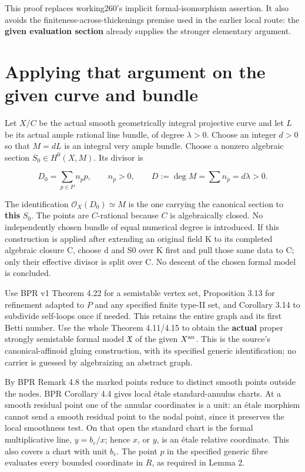\documentclass[
  11pt,
]{article}
\begin{document}
This proof replaces working260's implicit formal-isomorphism assertion.
It also avoids the finiteness-across-thickenings premise used in the
earlier local route: the \textbf{given evaluation section} already
supplies the stronger elementary argument.

\section{Applying that argument on the given curve and
bundle}\label{applying-that-argument-on-the-given-curve-and-bundle}

Let \(X/C\) be the actual smooth geometrically integral projective curve
and let \(L\) be its actual ample rational line bundle, of degree
\(\lambda>0\). Choose an integer \(d>0\) so that \(M=dL\) is an integral
very ample bundle. Choose a nonzero algebraic section
\(S_0\in H^0(X,M)\). Its divisor is

\[
 D_0=\sum_{p\in P}n_pp,\qquad n_p>0,
 \qquad D:=\deg M=\sum n_p=d\lambda>0.
\]

The identification \(\mathcal O_X(D_0)\simeq M\) is the one carrying the
canonical section to \textbf{this} \(S_0\). The points are
\(C\)-rational because \(C\) is algebraically closed. No independently
chosen bundle of equal numerical degree is introduced. If this
construction is applied after extending an original field K to its
completed algebraic closure C, choose d and S0 over K first and pull
those same data to C; only their effective divisor is split over C. No
descent of the chosen formal model is concluded.

Use BPR v1 Theorem 4.22 for a semistable vertex set, Proposition 3.13
for refinement adapted to \(P\) and any specified finite type-II set,
and Corollary 3.14 to subdivide self-loops once if needed. This retains
the entire graph and its first Betti number. Use the whole Theorem
4.11/4.15 to obtain the \textbf{actual} proper strongly semistable
formal model \(\mathfrak X\) of the given \(X^{\rm an}\). This is the
source's canonical-affinoid gluing construction, with its specified
generic identification; no carrier is guessed by algebraizing an
abstract graph.

By BPR Remark 4.8 the marked points reduce to distinct smooth points
outside the nodes. BPR Corollary 4.4 gives local étale standard-annulus
charts. At a smooth residual point one of the annular coordinates is a
unit: an étale morphism cannot send a smooth residual point to the nodal
point, since it preserves the local smoothness test. On that open the
standard chart is the formal multiplicative line, \(y=b_e/x\); hence
\(x\), or \(y\), is an étale relative coordinate. This also covers a
chart with unit \(b_e\). The point \(p\) in the specified generic fibre
evaluates every bounded coordinate in \(R\), as required in Lemma 2.
\end{document}
